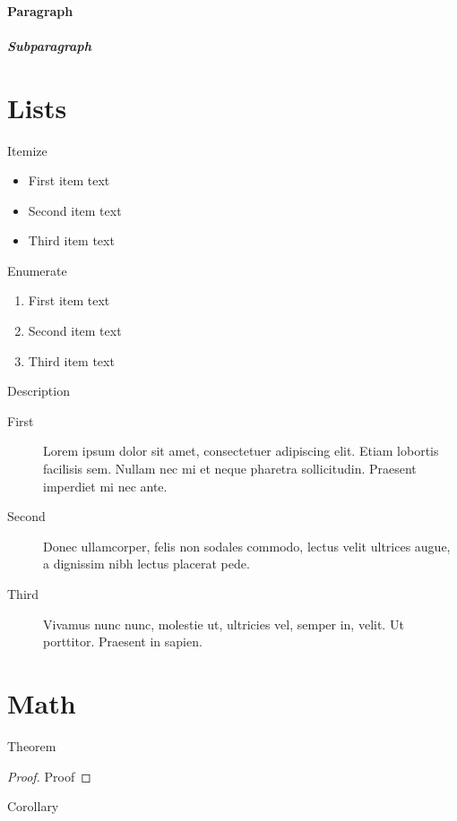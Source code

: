 \documentclass[english,counters by chapter]{uniud}
\begin{document}
\blindtext

\paragraph{Paragraph}

\blindtext

\subparagraph{Subparagraph}

\blindtext

\section{Lists}


Itemize
\begin{itemize}
\item First item text
\item Second item text
\item Third item text
\end{itemize}
Enumerate
\begin{enumerate}
\item First item text
\item Second item text
\item Third item text
\end{enumerate}
Description
\begin{description}
\item[First] 
	Lorem ipsum dolor sit amet, consectetuer adipiscing elit. Etiam lobortis facilisis sem. Nullam nec mi et neque pharetra sollicitudin. Praesent imperdiet mi nec ante.
\item[Second] 
	 Donec ullamcorper, felis non sodales commodo, lectus velit ultrices augue, a dignissim nibh lectus placerat pede.
\item[Third] 
	Vivamus nunc nunc, molestie ut, ultricies vel, semper in, velit. Ut porttitor. Praesent in sapien.
\end{description}


\section{Math}

\begin{theorem}
	\label{thm:first}
	Theorem
\end{theorem}
\begin{proof}
	Proof
\end{proof}

\begin{corollary}
	\label{cor:first}
	Corollary
\end{corollary}
\end{document}
